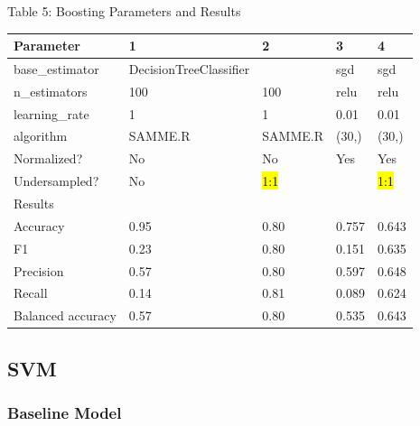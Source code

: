 \documentclass{article}
\begin{document}
\begin{table}
	
	\centering
	Table 5: Boosting Parameters and Results \\
	\begin{tabular}{ l l l l l }
		\hline
		Parameter & 1 & 2 & 3 & 4\\
		\hline
		base\_estimator & DecisionTreeClassifier & & sgd & sgd\\
		n\_estimators & 100 & 100 & relu & relu\\
		learning\_rate & 1 & 1 & 0.01 & 0.01\\
		algorithm & SAMME.R & SAMME.R & (30,) & (30,)\\
		Normalized? & No & No & Yes & Yes\\
		Undersampled? & No & \hl{1:1} &  & \hl{1:1}\\
		\hline
		Results & & & & \\
		\hline
		Accuracy & 0.95 & 0.80 & 0.757 & 0.643 \\
		F1 & 0.23 & 0.80 & 0.151 & 0.635 \\
		Precision & 0.57 & 0.80 & 0.597 & 0.648  \\
		Recall & 0.14 & 0.81 & 0.089 & 0.624 \\
		Balanced accuracy & 0.57 & 0.80 & 0.535 & 0.643 \\
		
		\hline 
	\end{tabular}
\end{table}



\subsection{SVM}
\subsubsection*{Baseline Model}
\end{document}

